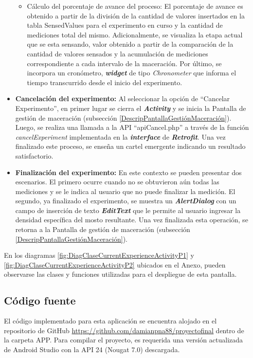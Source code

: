 \begin{itemize}
\begin{itemize}
                    \item Cálculo del porcentaje de avance del proceso: El porcentaje de avance es obtenido a partir de la división de la cantidad de valores insertados en la tabla SensedValues para el experimento en curso y la cantidad de mediciones total del mismo. Adicionalmente, se visualiza la etapa actual que se esta sensando, valor obtenido a partir de la comparación de la cantidad de valores sensados y la acumulación de mediciones correspondiente a cada intervalo de la maceración. Por último, se incorpora un cronómetro, \textbf{\textit{widget}} de tipo \textit{Chronometer} que informa el tiempo transcurrido desde el inicio del experimento.
                \end{itemize}
               
                \item \textbf{Cancelación del experimento:} Al seleccionar la opción de ``Cancelar Experimento'', en primer lugar se cierra el \textbf{\textit{\gls{Activity}}} y se inicia la Pantalla de gestión de maceración (subsección \ref{DescripPantallaGestiónMaceración}). Luego, se realiza una llamada a la API ``apiCancel.php'' a través de la función \textit{cancelExperiment} implementada en la \textbf{\textit{interface}} de \textbf{\textit{\gls{Retrofit}}}. Una vez finalizado este proceso, se enseña un cartel emergente indicando un resultado satisfactorio.
                
                \item \textbf{Finalización del experimento:} En este contexto se pueden presentar dos escenarios. El primero ocurre cuando no se obtuvieron aún todas las mediciones y se le indica al usuario que no puede finalizar la medición. El segundo, ya finalizado el experimento, se muestra un \textbf{\textit{\gls{AlertDialog}}} con un campo de inserción de texto \textbf{\textit{\gls{EditText}}} que le permite al usuario ingresar la densidad específica del mosto resultante. Una vez finalizada esta operación, se retorna a la Pantalla de gestión de maceración (subsección \ref{DescripPantallaGestiónMaceración}).
               
            \end{itemize}
             
            
            \par En los diagramas \ref{fig:DiagClaseCurrentExperienceActivityP1} y \ref{fig:DiagClaseCurrentExperienceActivityP2} ubicados en el Anexo, pueden observarse las clases y funciones utilizadas para el despliegue de esta pantalla.
            
    \subsection{Código fuente}
    \par El código implementado para esta aplicación se encuentra alojado en el repositorio de GitHub \url{https://github.com/damianpna88/proyectofinal} dentro de la carpeta APP. Para compilar el proyecto, es requerida una versión actualizada de Android Studio con la API 24 (Nougat 7.0) descargada.